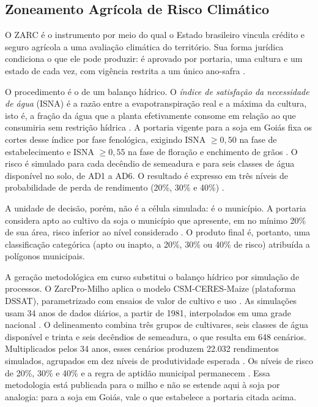 \subsection{Zoneamento Agrícola de Risco Climático}\label{sec:sota-zarc}

O ZARC é o instrumento por meio do qual o Estado brasileiro vincula crédito e seguro agrícola a uma
avaliação climática do território. Sua forma jurídica condiciona o que ele pode produzir: é aprovado por
portaria, uma cultura e um estado de cada vez, com vigência restrita a um único ano-safra
\citep[art.~1º, parágrafo único]{mapa_port_2026}.

O procedimento é o de um balanço hídrico. O \emph{índice de satisfação da necessidade de água} (ISNA)
é a razão entre a evapotranspiração real e a máxima da cultura, isto é, a fração da água que a planta
efetivamente consome em relação ao que consumiria sem restrição hídrica \citep[p.~1]{junior_indice_2009}.
A portaria vigente para a soja em Goiás fixa os cortes desse índice por fase fenológica, exigindo
ISNA $\geq 0{,}50$ na fase de estabelecimento e ISNA $\geq 0{,}55$ na fase de floração e enchimento de
grãos \citep[§1.9.4]{mapa_port_2026}. O risco é simulado para cada decêndio de semeadura e para
seis classes de água disponível no solo, de AD1 a AD6. O resultado é expresso em três níveis de
probabilidade de perda de rendimento (20\%, 30\% e 40\%) \citep[\S 1.6, 2.1--2.2]{mapa_port_2026}.

A unidade de decisão, porém, não é a célula simulada: é o município. A portaria considera apto ao
cultivo da soja o município que apresente, em no mínimo 20\% de sua área, risco inferior ao nível
considerado \citep[§1.10]{mapa_port_2026}. O produto final é, portanto, uma classificação
categórica (apto ou inapto, a 20\%, 30\% ou 40\% de risco) atribuída a polígonos municipais.

A geração metodológica em curso substitui o balanço hídrico por simulação de processos. O ZarcPro-Milho
aplica o modelo CSM-CERES-Maize (plataforma DSSAT), parametrizado com ensaios de valor de cultivo e
uso \citep[p.~11]{amaral_metodologia_2023}. As simulações usam 34 anos de dados diários, a partir de 1981,
interpolados em uma grade nacional \citep[p.~13]{amaral_metodologia_2023}. O delineamento combina três
grupos de cultivares, seis classes de água disponível e trinta e seis decêndios de semeadura, o que
resulta em 648 cenários. Multiplicados pelos 34 anos, esses cenários produzem 22.032 rendimentos
simulados, agrupados em dez níveis de produtividade esperada \citep[pp.~19--20]{amaral_metodologia_2023}.
Os níveis de risco de 20\%, 30\% e 40\% e a regra de aptidão municipal permanecem
\citep[p.~20]{amaral_metodologia_2023}. Essa metodologia está publicada para o milho e não se estende
aqui à soja por analogia: para a soja em Goiás, vale o que estabelece a portaria citada acima.

